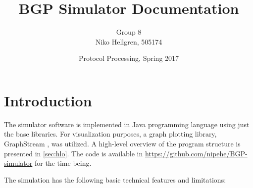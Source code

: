 \documentclass[10pt,a4paper,titlepage]{report}
\author{Group 8\\Niko Hellgren, 505174}
\title{BGP Simulator Documentation}
\date{Protocol Processing, Spring 2017}
\begin{document}
\maketitle
\tableofcontents

\section{Introduction}
The simulator software is implemented in Java programming language using just the base libraries. For visualization purposes, a graph plotting library, GraphStream \cite{graphstreamteam2017}, was utilized. A high-level overview of the program structure is presented in \ref{sec:hlo}. The code is available in \url{https://github.com/nipehe/BGP-simulator} for the time being.

The simulation has the following basic technical features and limitations:
\end{document}
